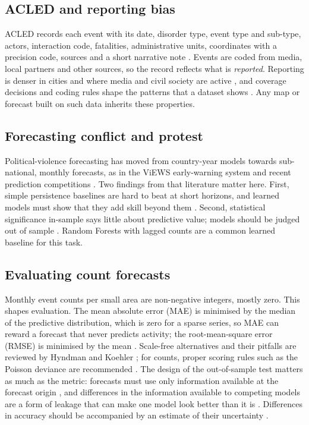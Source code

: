\documentclass[11pt,a4paper]{article}
\begin{document}
\subsection{ACLED and reporting bias}

ACLED records each event with its date, disorder type, event type and sub-type, actors, interaction code, fatalities, administrative units, coordinates with a precision code, sources and a short narrative note \cite{raleigh2010,acled2024}. Events are coded from media, local partners and other sources, so the record reflects what is \emph{reported}. Reporting is denser in cities and where media and civil society are active \cite{weidmann2016}, and coverage decisions and coding rules shape the patterns that a dataset shows \cite{raleigh2023}. Any map or forecast built on such data inherits these properties.

\subsection{Forecasting conflict and protest}

Political-violence forecasting has moved from country-year models towards sub-national, monthly forecasts, as in the ViEWS early-warning system \cite{hegre2019,hegre2021} and recent prediction competitions \cite{hegre2022,vesco2022}. Two findings from that literature matter here. First, simple persistence baselines are hard to beat at short horizons, and learned models must show that they add skill beyond them \cite{hegre2022}. Second, statistical significance in-sample says little about predictive value; models should be judged out of sample \cite{ward2010,bowlsby2020}. Random Forests \cite{breiman2001} with lagged counts are a common learned baseline for this task.

\subsection{Evaluating count forecasts}

Monthly event counts per small area are non-negative integers, mostly zero. This shapes evaluation. The mean absolute error (MAE) is minimised by the median of the predictive distribution, which is zero for a sparse series, so MAE can reward a forecast that never predicts activity; the root-mean-square error (RMSE) is minimised by the mean \cite{gneiting2011}. Scale-free alternatives and their pitfalls are reviewed by Hyndman and Koehler \cite{hyndman2006}; for counts, proper scoring rules such as the Poisson deviance are recommended \cite{czado2009}. The design of the out-of-sample test matters as much as the metric: forecasts must use only information available at the forecast origin \cite{tashman2000,bergmeir2012}, and differences in the information available to competing models are a form of leakage that can make one model look better than it is \cite{kapoor2023}. Differences in accuracy should be accompanied by an estimate of their uncertainty \cite{diebold1995}.
\end{document}

